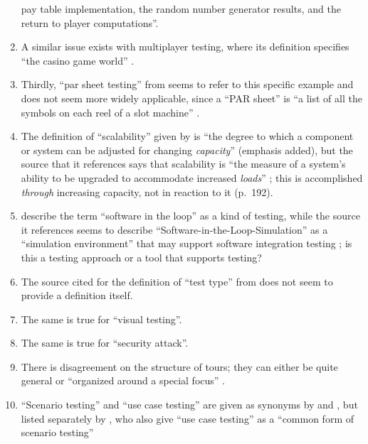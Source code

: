 \begin{enumerate}
            pay table implementation, the random number generator results, and
            the return to player computations''.
      \item A similar issue exists with multiplayer testing, where its
            definition specifies ``the casino game world'' \citepISTQB{}.
      \item Thirdly, ``par sheet testing'' from \citepISTQB{} seems to
            refer to this specific example and does not seem more widely
            applicable, since a ``PAR sheet'' is ``a list of all the symbols
            on each reel of a slot machine'' \citep{Bluejay2024}.
      \item The definition of ``scalability'' given by \citetISTQB{} is
            ``the degree to which a component or system can be adjusted for
            changing \emph{capacity}'' (emphasis added), but the source that it
            references says that scalability is ``the measure of a system's
            ability to be upgraded to accommodate increased \emph{loads}''
            \citep[p.~381,~emphasis added]{GerrardAndThompson2002}; this is
            accomplished \emph{through} increasing capacity, not in reaction to
            it (p.~192).
      \item \citetISTQB{} describe the term ``software in the loop'' as a
            kind of testing, while the source it references seems to describe
            ``Software-in-the-Loop-Simulation'' as a ``simulation environment''
            that may support software integration testing
            \citep[p.~153]{SPICE2022}; is this a testing approach or a tool
            that supports testing?
      \item The source cited for the definition of ``test type'' from
            \citepISTQB{} does not seem to provide a definition itself.
      \item The same is true for ``visual testing''.
      \item The same is true for ``security attack''.
      \item There is disagreement on the structure of tours; they can either be
            quite general \citep[p.~34]{IEEE2022} or ``organized around a
            special focus'' \citepISTQB{}.
      \item ``Scenario testing'' and ``use case testing'' are given as synonyms
            by \citetISTQB{} and \citet[pp.~47-49]{Kam2008}, but listed
            separately by \citet[p.~22]{IEEE2022}, who also give ``use case
            testing'' as a ``common form of scenario testing''

\end{enumerate}
